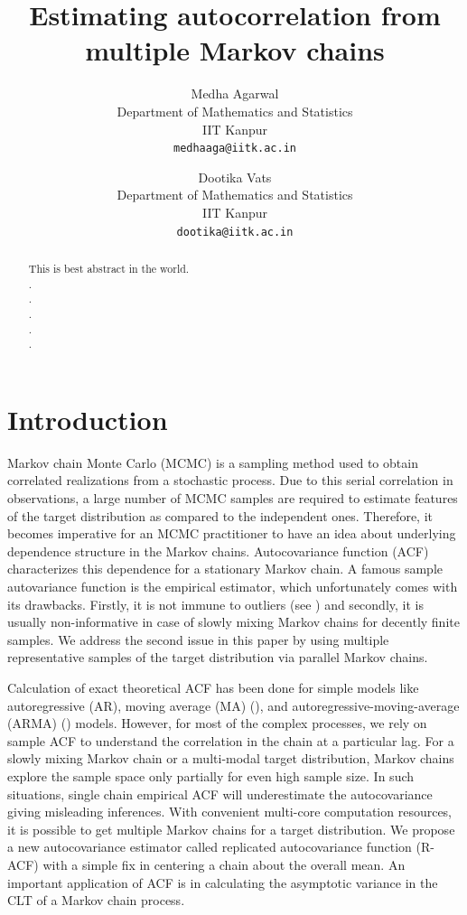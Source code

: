 \documentclass[11pt]{article}
\title{Estimating autocorrelation from multiple Markov chains}
\author{
  Medha Agarwal \\
  Department of Mathematics and Statistics\\
  IIT Kanpur\\
  \texttt{medhaaga@iitk.ac.in} \and
 Dootika Vats \\
  Department of Mathematics and Statistics\\
  IIT Kanpur\\
  \texttt{dootika@iitk.ac.in}
}
\theoremstyle{remark}
\begin{document}
\maketitle


\onehalfspacing
\begin{abstract}
    This is best abstract in the world.\\.\\.\\.\\.\\.
\end{abstract}


\section{Introduction} \label{sec:intro}

Markov chain Monte Carlo (MCMC) is a sampling method used to obtain correlated realizations from a stochastic process. Due to this serial correlation in observations, a large number of MCMC samples are required to estimate features of the target distribution as compared to the independent ones. Therefore, it becomes imperative for an MCMC practitioner to have an idea about underlying dependence structure in the Markov chains. Autocovariance function (ACF) characterizes this dependence for a stationary Markov chain. A famous sample autovariance function is the empirical estimator, which unfortunately comes with its drawbacks. Firstly, it is not immune to outliers (see \cite{ma2000highly}) and secondly, it is usually non-informative in case of slowly mixing Markov chains for decently finite samples. We address the second issue in this paper by using multiple representative samples of the target distribution via parallel Markov chains.

Calculation of exact theoretical ACF has been done for simple models like autoregressive (AR), moving average (MA) (\cite{quenouille1947notes}), and autoregressive-moving-average (ARMA) (\cite{box2015time}) models. However, for most of the complex processes, we rely on sample ACF to understand the correlation in the chain at a particular lag. For a slowly mixing Markov chain or a multi-modal target distribution, Markov chains explore the sample space only partially for even high sample size. In such situations, single chain empirical ACF will underestimate the autocovariance giving misleading inferences. With convenient multi-core computation resources, it is possible to get multiple Markov chains for a target distribution.  We propose a new autocovariance estimator called replicated autocovariance function (R-ACF) with a simple fix in centering a chain about the overall mean. An important application of ACF is in calculating the asymptotic variance in the CLT of a Markov chain process.   
\end{document}
